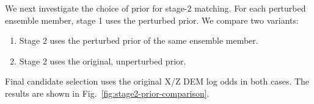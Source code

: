 We next investigate the choice of prior for stage-2 matching.
For each perturbed ensemble member, stage 1 uses the perturbed prior.
We compare two variants:
\begin{enumerate}
    \item Stage 2 uses the perturbed prior of the same ensemble member.
    \item Stage 2 uses the original, unperturbed prior.
\end{enumerate}
Final candidate selection uses the original X/Z DEM log odds in both cases.
The results are shown in Fig.~\ref{fig:stage2-prior-comparison}.


